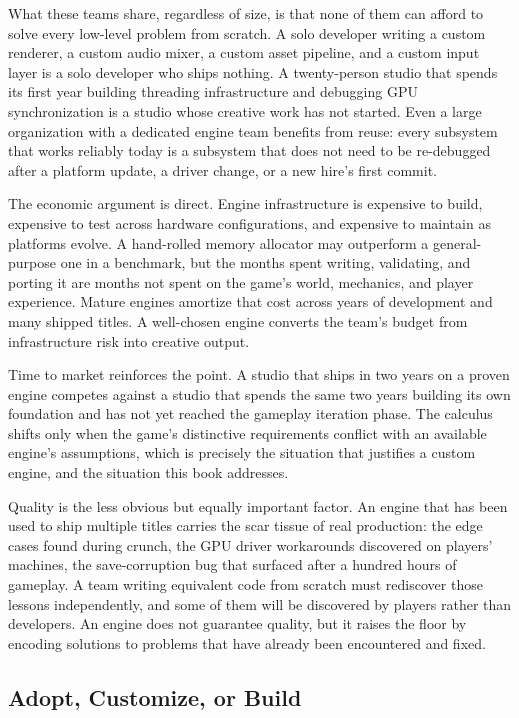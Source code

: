\documentclass[
  11pt,
  letterpaper,
  DIV=11,
  numbers=noendperiod,
  twoside,
  open=right]{scrreprt}
\newcounter{none} %
\begin{document}
What these teams share, regardless of size, is that none of them can
afford to solve every low-level problem from scratch. A solo developer
writing a custom renderer, a custom audio mixer, a custom asset
pipeline, and a custom input layer is a solo developer who ships
nothing. A twenty-person studio that spends its first year building
threading infrastructure and debugging GPU synchronization is a studio
whose creative work has not started. Even a large organization with a
dedicated engine team benefits from reuse: every subsystem that works
reliably today is a subsystem that does not need to be re-debugged after
a platform update, a driver change, or a new hire's first commit.

The economic argument is direct. Engine infrastructure is expensive to
build, expensive to test across hardware configurations, and expensive
to maintain as platforms evolve. A hand-rolled memory allocator may
outperform a general-purpose one in a benchmark, but the months spent
writing, validating, and porting it are months not spent on the game's
world, mechanics, and player experience. Mature engines amortize that
cost across years of development and many shipped titles. A well-chosen
engine converts the team's budget from infrastructure risk into creative
output.

Time to market reinforces the point. A studio that ships in two years on
a proven engine competes against a studio that spends the same two years
building its own foundation and has not yet reached the gameplay
iteration phase. The calculus shifts only when the game's distinctive
requirements conflict with an available engine's assumptions, which is
precisely the situation that justifies a custom engine, and the
situation this book addresses.

Quality is the less obvious but equally important factor. An engine that
has been used to ship multiple titles carries the scar tissue of real
production: the edge cases found during crunch, the GPU driver
workarounds discovered on players' machines, the save-corruption bug
that surfaced after a hundred hours of gameplay. A team writing
equivalent code from scratch must rediscover those lessons
independently, and some of them will be discovered by players rather
than developers. An engine does not guarantee quality, but it raises the
floor by encoding solutions to problems that have already been
encountered and fixed.

\subsection{Adopt, Customize, or Build}\label{adopt-customize-or-build}
\end{document}
